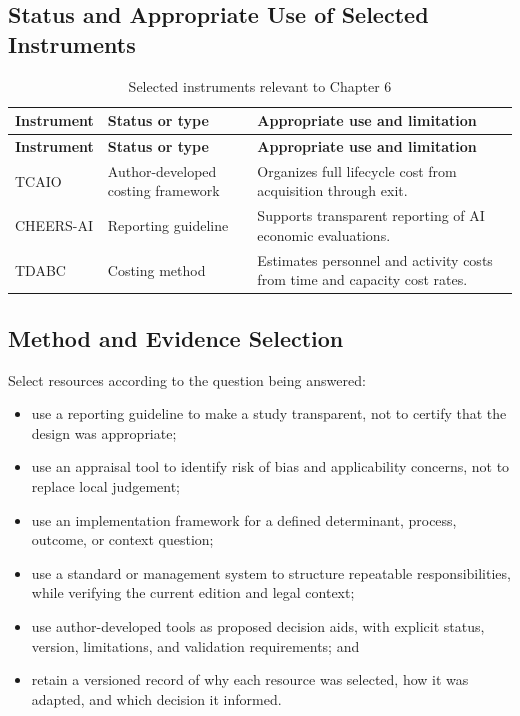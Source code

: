 \subsection{Status and Appropriate Use of Selected Instruments}
\begin{longtable}{@{}p{}p{}p{}@{}}
\caption{Selected instruments relevant to Chapter 6}
\label{tab:comp-ch06-instrument-status}\\
\toprule
\textbf{Instrument} & \textbf{Status or type} & \textbf{Appropriate use and limitation} \\
\midrule
\endfirsthead
\toprule
\textbf{Instrument} & \textbf{Status or type} & \textbf{Appropriate use and limitation} \\
\midrule
\endhead
\bottomrule
\endlastfoot
TCAIO & Author-developed costing framework & Organizes full lifecycle cost from acquisition through exit. \\
CHEERS-AI & Reporting guideline & Supports transparent reporting of AI economic evaluations. \\
TDABC & Costing method & Estimates personnel and activity costs from time and capacity cost rates. \\
\end{longtable}

\subsection{Method and Evidence Selection}
Select resources according to the question being answered:
\begin{itemize}
 \item use a reporting guideline to make a study transparent, not to certify that the design was appropriate;
 \item use an appraisal tool to identify risk of bias and applicability concerns, not to replace local judgement;
 \item use an implementation framework for a defined determinant, process, outcome, or context question;
 \item use a standard or management system to structure repeatable responsibilities, while verifying the current edition and legal context;
 \item use author-developed tools as proposed decision aids, with explicit status, version, limitations, and validation requirements; and
 \item retain a versioned record of why each resource was selected, how it was adapted, and which decision it informed.
\end{itemize}

